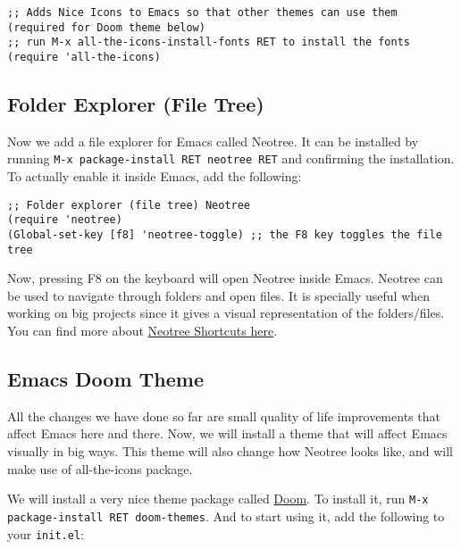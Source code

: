\documentclass[12pt, a4paper]{article}
\begin{document}
\lstset{language=Lisp,label= ,caption= ,captionpos=b,numbers=none}
\begin{lstlisting}
;; Adds Nice Icons to Emacs so that other themes can use them (required for Doom theme below)
;; run M-x all-the-icons-install-fonts RET to install the fonts
(require 'all-the-icons)
\end{lstlisting}

\subsection{Folder Explorer (File Tree)}
\label{sec:orgb75cc29}

Now we add a file explorer for Emacs called Neotree. It can be installed by running \texttt{M-x package-install RET neotree RET} and confirming the installation. To actually enable it inside Emacs, add the following:

\lstset{language=Lisp,label= ,caption= ,captionpos=b,numbers=none}
\begin{lstlisting}
;; Folder explorer (file tree) Neotree
(require 'neotree)
(Global-set-key [f8] 'neotree-toggle) ;; the F8 key toggles the file tree
\end{lstlisting}

Now, pressing F8 on the keyboard will open Neotree inside Emacs. Neotree can be used to navigate through folders and open files. It is specially useful when working on big projects since it gives a visual representation of the folders/files. You can find more about \href{https://www.emacswiki.org/emacs/NeoTree\#toc4}{Neotree Shortcuts here}.

\subsection{Emacs Doom Theme}
\label{sec:org726e9df}

All the changes we have done so far are small quality of life improvements that affect Emacs here and there. Now, we will install a theme that will affect Emacs visually in big ways. This theme will also change how Neotree looks like, and will make use of all-the-icons package.

We will install a very nice theme package called \href{https://github.com/hlissner/emacs-doom-themes}{Doom}. To install it, run \texttt{M-x package-install RET doom-themes}. And to start using it, add the following to your \texttt{init.el}:
\end{document}

